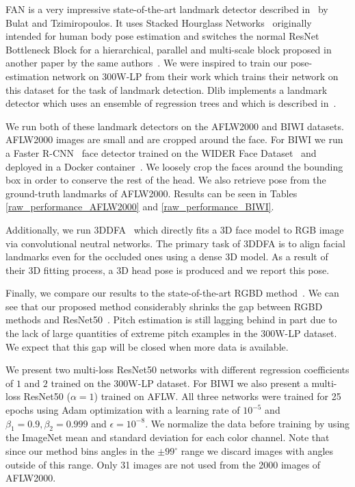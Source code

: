 \documentclass[10pt,twocolumn,letterpaper]{article}
\begin{document}
FAN is a very impressive state-of-the-art landmark detector described in~\cite{bulat2017far} by Bulat and Tzimiropoulos. It uses Stacked Hourglass Networks~\cite{newell2016stacked} originally intended for human body pose estimation and switches the normal ResNet Bottleneck Block for a hierarchical, parallel and multi-scale block proposed in another paper by the same authors~\cite{bulat2017binarized}. We were inspired to train our pose-estimation network on 300W-LP from their work which trains their network on this dataset for the task of landmark detection.
Dlib implements a landmark detector which uses an ensemble of regression trees and which is described in~\cite{kazemi2014one}.

We run both of these landmark detectors on the AFLW2000 and BIWI datasets. AFLW2000 images are small and are cropped around the face. For BIWI we run a Faster R-CNN~\cite{renNIPS15fasterrcnn} face detector trained on the WIDER Face Dataset~\cite{yang2016wider,jiang2017face} and deployed in a Docker container~\cite{ruiz2017dockerface}. We loosely crop the faces around the bounding box in order to conserve the rest of the head. We also retrieve pose from the ground-truth landmarks of AFLW2000. Results can be seen in Tables \ref{raw_performance_AFLW2000} and \ref{raw_performance_BIWI}.

Additionally, we run 3DDFA~\cite{zhu2016face} which directly fits a 3D face model to RGB image via convolutional neutral networks. The primary task of 3DDFA is to align facial landmarks even for the occluded ones using a dense 3D model. As a result of their 3D fitting process, a 3D head pose is produced and we report this pose.

Finally, we compare our results to the state-of-the-art RGBD method~\cite{3DMM}. We can see that our proposed method considerably shrinks the gap between RGBD methods and ResNet50~\cite{He2015}. Pitch estimation is still lagging behind in part due to the lack of large quantities of extreme pitch examples in the 300W-LP dataset. We expect that this gap will be closed when more data is available.

We present two multi-loss ResNet50 networks with different regression coefficients of $1$ and $2$ trained on the 300W-LP dataset. For BIWI we also present a multi-loss ResNet50 ($\alpha=1$) trained on AFLW. All three networks were trained for 25 epochs using Adam optimization\cite{kingma2014adam} with a learning rate of $10^{-5}$ and $\beta_{1}=0.9, \beta_{2}=0.999$ and $\epsilon=10^{-8}$. We normalize the data before training by using the ImageNet mean and standard deviation for each color channel. Note that since our method bins angles in the $\pm 99^\circ$ range we discard images with angles outside of this range. Only 31 images are not used from the 2000 images of AFLW2000.
\end{document}

